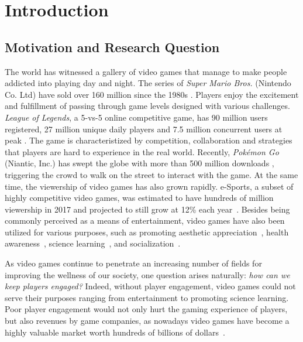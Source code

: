 
\chapter{Introduction} %

\label{chapter:intro} %

\section{Motivation and Research Question}\label{chap1:motiv}

The world has witnessed a gallery of video games that manage to make people addicted into playing day and night. The series of \textit{Super Mario Bros.} (Nintendo Co. Ltd) have sold over 160 million since the 1980s \cite{mariosale}. Players enjoy the excitement and fulfillment of passing through game levels designed with various challenges. \textit{League of Legends}, a 5-vs-5 online competitive game, has 90 million users registered, 27 million unique daily players and 7.5 million concurrent users at peak \cite{lol_fanbase,lol_27million}. The game is characteristized by competition, collaboration and strategies that players are hard to experience in the real world. Recently, \textit{Pok\'{e}mon Go} (Niantic, Inc.) has swept the globe with more than 500 million downloads \cite{pokemongo}, triggering the crowd to walk on the street to interact with the game. At the same time, the viewership of video games has also grown rapidly. e-Sports, a subset of highly competitive video games, was estimated to have hundreds of million viewership in 2017 and projected to still grow at 12\% each year~\cite{superdata2017}. Besides being commonly perceived as a means of entertainment, video games have also been utilized for various purposes, such as promoting aesthetic appreciation~\cite{jarvinen2008understanding}, health awareness~\cite{shiyko2016effects}, science learning~\cite{cooper2013increasing}, and socialization~\cite{ferguson2013friends}.

As video games continue to penetrate an increasing number of fields for improving the wellness of our society, one question arises naturally: \textit{how can we keep players engaged?} Indeed, without player engagement, video games could not serve their purposes ranging from entertainment to promoting science learning. Poor player engagement would not only hurt the gaming experience of players, but also revenues by game companies, as nowadays video games have become a highly valuable market worth hundreds of billions of dollars~\cite{today_video_game_market}.

